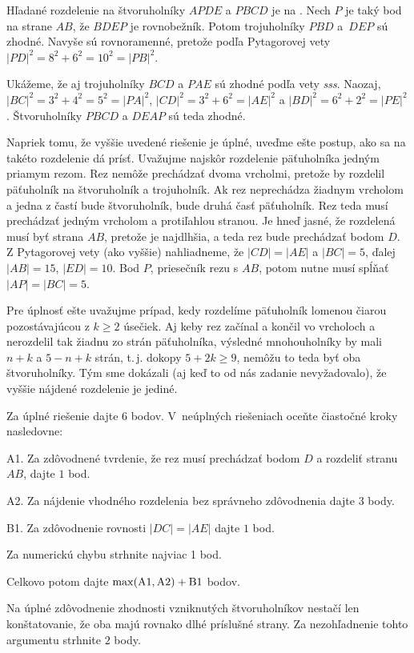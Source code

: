 {%
Hľadané rozdelenie na štvoruholníky $APDE$ a $PBCD$ je na \obr{}.
Nech $P$ je taký bod na strane $AB$, že $BDEP$ je rovnobežník. Potom trojuholníky $PBD$ a~$DEP$ sú zhodné. Navyše sú rovnoramenné, pretože podľa Pytagorovej vety $|PD|^2={8^2+6^2}=10^2=|PB|^2$.
%

Ukážeme, že aj trojuholníky $BCD$ a $PAE$ sú zhodné podľa vety \emph{sss}.
Naozaj, $|BC|^2=3^2+4^2=5^2=|PA|^2$, $|CD|^2=3^2+6^2=|AE|^2$ a $|BD|^2=6^2+2^2=|PE|^2$.
Štvoruholníky $PBCD$ a $DEAP$ sú teda zhodné.

\poznamka
Napriek tomu, že vyššie uvedené riešenie je úplné, uveďme ešte postup, ako sa na takéto rozdelenie dá prísť. Uvažujme najskôr rozdelenie päťuholníka jedným priamym rezom. Rez nemôže prechádzať dvoma vrcholmi, pretože by rozdelil päťuholník na štvoruholník a trojuholník. Ak rez neprechádza žiadnym vrcholom a jedna z častí bude štvoruholník, bude druhá časť päťuholník. Rez teda musí prechádzať jedným vrcholom a protiľahlou stranou.
Je hneď jasné, že rozdelená musí byť strana $AB$, pretože je najdlhšia, a teda rez bude prechádzať bodom $D$.
Z Pytagorovej vety (ako vyššie) nahliadneme, že $|CD|=|AE|$ a $|BC|= 5$, ďalej $|AB| = 15$, $|ED|= 10$.
Bod $P$, priesečník rezu s $AB$, potom nutne musí spĺňať $|AP|=|BC| =5$.

Pre úplnosť ešte uvažujme prípad, kedy rozdelíme päťuholník lomenou čiarou pozostávajúcou z $k\ge 2$ úsečiek. Aj keby rez začínal a končil vo vrcholoch a nerozdelil tak žiadnu zo strán päťuholníka, výsledné mnohouholníky by mali $n+k$ a $5-n+k$ strán, t.\,j. dokopy $5+2k\ge 9$, nemôžu to teda byť oba štvoruholníky. Tým sme dokázali (aj keď to od nás zadanie nevyžadovalo), že vyššie nájdené rozdelenie je jediné.


\schemaABC
Za úplné riešenie dajte 6 bodov. V~neúplných riešeniach oceňte čiastočné kroky nasledovne:

\smallskip
\item{A1.} Za zdôvodnené tvrdenie, že rez musí prechádzať bodom $D$ a rozdeliť stranu $AB$, dajte $1$ bod.
\item{A2.} Za nájdenie vhodného rozdelenia bez správneho zdôvodnenia dajte $3$ body.
\item{B1.} Za zdôvodnenie rovnosti $|DC|=|AE|$ dajte $1$ bod.

\smallskip\noindent
Za numerickú chybu strhnite najviac 1 bod.

Celkovo potom dajte $\rm\max(A1,A2)+B1$ bodov.

\poznamka
 Na úplné zdôvodnenie zhodnosti vzniknutých štvoruholníkov nestačí len konštatovanie, že oba majú rovnako dlhé príslušné strany. Za nezohľadnenie tohto argumentu strhnite $2$ body.

\endschema
}

